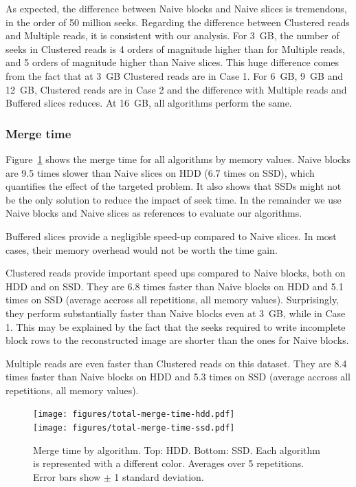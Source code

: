 \documentclass[10pt, conference, compsocconf]{IEEEtran}
\begin{document}
As expected, the difference between Naive blocks and Naive slices is
tremendous, in the order of 50 million seeks. Regarding the difference between
Clustered reads and Multiple reads, it is consistent with our analysis. For
3~GB, the number of seeks in Clustered reads is 4 orders of magnitude
higher than for Multiple reads, and 5 orders of magnitude higher than
Naive slices. This huge difference comes from the fact that at 3~GB
Clustered reads are in Case 1. For 6~GB, 9~GB and 12~GB, Clustered
reads are in Case 2 and the difference with Multiple reads and
Buffered slices reduces. At 16~GB, all algorithms perform the same.

\subsubsection{Merge time}

Figure~\ref{fig:merge-time} shows the merge time for all algorithms by
memory values. Naive blocks are 9.5 times slower than Naive slices on
HDD (6.7 times on SSD), which quantifies the effect of the targeted
problem. It also shows that SSDs might not be the only solution to
reduce the impact of seek time. In the remainder we use Naive blocks
and Naive slices as references to evaluate our algorithms.

Buffered slices provide a negligible speed-up compared to Naive
slices. In most cases, their memory overhead would not be worth the
time gain.

Clustered reads provide important speed ups compared to Naive blocks,
both on HDD and on SSD. They are 6.8 times faster than Naive blocks on
HDD and 5.1 times on SSD (average accross all repetitions, all memory
values). Surprisingly, they perform substantially faster than Naive
blocks even at 3~GB, while in Case 1. This may be explained by the
fact that the seeks required to write incomplete block rows to the
reconstructed image are shorter than the ones for Naive blocks.

Multiple reads are even faster than Clustered reads on this
dataset. They are 8.4 times faster than Naive blocks on HDD and 5.3
times on SSD (average accross all repetitions, all memory values).

\begin{figure}[h]
  \centering
  \texttt{[image: figures/total-merge-time-hdd.pdf]}\\
  \texttt{[image: figures/total-merge-time-ssd.pdf]}
  \hfill
  \caption{Merge time by algorithm. Top: HDD. Bottom: SSD. Each
    algorithm is represented with a different color. Averages over 5
    repetitions. Error bars show $\pm$ 1 standard deviation. }
\label{fig:merge-time}
\end{figure}
\end{document}
